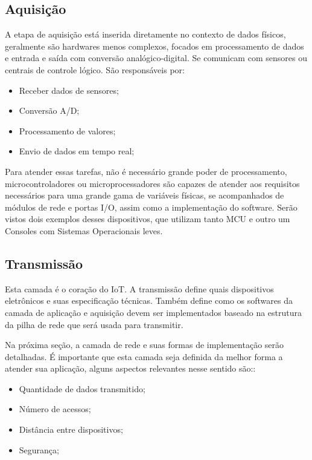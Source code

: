 \subsection{Aquisição}
\label{subsection:aquisicao}

A etapa de aquisição está inserida diretamente no contexto de dados físicos, geralmente são hardwares menos complexos, focados em processamento de dados e entrada e saída com conversão analógico-digital. Se comunicam com sensores ou centrais de controle lógico. São responsáveis por:

\begin{itemize}
	\item Receber dados de sensores;
	\item Conversão A/D;
	\item Processamento de valores;
	\item Envio de dados em tempo real;
\end{itemize} 

Para atender essas tarefas, não é necessário grande poder de processamento, microcontroladores ou microprocessadores são capazes de atender aos requisitos necessários para uma grande gama de variáveis físicas, se acompanhados de módulos de rede e portas I/O, assim como a implementação do software. Serão vistos dois exemplos desses dispositivos, que utilizam tanto MCU  e outro um Consoles com Sistemas Operacionais leves.
 

\subsection{Transmissão}
\label{subsection:transmicao}

Esta camada é o coração do IoT. A transmissão define quais dispositivos eletrônicos e suas especificação técnicas. Também define como os softwares da camada de aplicação e aquisição devem ser implementados baseado na estrutura da pilha de rede que será usada para transmitir.

Na próxima seção, a camada de rede e suas formas de implementação serão detalhadas. É importante que esta camada seja definida da melhor forma a atender sua aplicação, alguns aspectos relevantes nesse sentido são:: 
\begin{itemize}
\item Quantidade de dados transmitido;
\item Número de acessos; 
\item Distância entre dispositivos;
\item Segurança;
\end{itemize}

